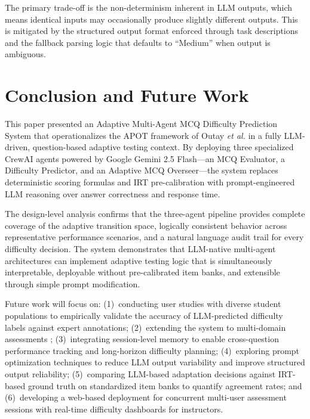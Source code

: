 \documentclass[conference]{IEEEtran}
\begin{document}
The primary trade-off is the non-determinism inherent in LLM outputs, which means identical inputs may occasionally produce slightly different outputs. This is mitigated by the structured output format enforced through task descriptions and the fallback parsing logic that defaults to ``Medium'' when output is ambiguous.

\section{Conclusion and Future Work}

This paper presented an Adaptive Multi-Agent MCQ Difficulty Prediction System that operationalizes the APOT framework of Outay \textit{et al.} \cite{outay2024} in a fully LLM-driven, question-based adaptive testing context. By deploying three specialized CrewAI agents powered by Google Gemini 2.5 Flash---an MCQ Evaluator, a Difficulty Predictor, and an Adaptive MCQ Overseer---the system replaces deterministic scoring formulas and IRT pre-calibration with prompt-engineered LLM reasoning over answer correctness and response time.

The design-level analysis confirms that the three-agent pipeline provides complete coverage of the adaptive transition space, logically consistent behavior across representative performance scenarios, and a natural language audit trail for every difficulty decision. The system demonstrates that LLM-native multi-agent architectures can implement adaptive testing logic that is simultaneously interpretable, deployable without pre-calibrated item banks, and extensible through simple prompt modification.

Future work will focus on: (1)~conducting user studies with diverse student populations to empirically validate the accuracy of LLM-predicted difficulty labels against expert annotations; (2)~extending the system to multi-domain assessments ; (3)~integrating session-level memory to enable cross-question performance tracking and long-horizon difficulty planning; (4)~exploring prompt optimization techniques to reduce LLM output variability and improve structured output reliability; (5)~comparing LLM-based adaptation decisions against IRT-based ground truth on standardized item banks to quantify agreement rates; and (6)~developing a web-based deployment for concurrent multi-user assessment sessions with real-time difficulty dashboards for instructors.
\end{document}
